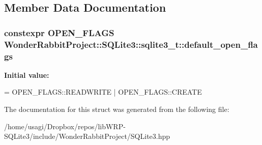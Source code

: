 \subsection{Member Data Documentation}
\hypertarget{structWonderRabbitProject_1_1SQLite3_1_1sqlite3__t_a35b1a27d6aaf21d609df8349bfc9d2ce}{
\subsubsection[{default\-\_\-open\-\_\-flags}]{\setlength{\rightskip}{0pt plus 5cm}constexpr O\-P\-E\-N\-\_\-\-F\-L\-A\-G\-S Wonder\-Rabbit\-Project\-::\-S\-Q\-Lite3\-::sqlite3\-\_\-t\-::default\-\_\-open\-\_\-flags\hspace{0.3cm}{\ttfamily [static]}}}\label{structWonderRabbitProject_1_1SQLite3_1_1sqlite3__t_a35b1a27d6aaf21d609df8349bfc9d2ce}
{\bfseries Initial value\-:}
\begin{DoxyCode}
= OPEN\_FLAGS::READWRITE
        | OPEN\_FLAGS::CREATE
\end{DoxyCode}


The documentation for this struct was generated from the following file\-:\begin{DoxyCompactItemize}
\item 
/home/usagi/\-Dropbox/repos/lib\-W\-R\-P-\/\-S\-Q\-Lite3/include/\-Wonder\-Rabbit\-Project/S\-Q\-Lite3.\-hpp\end{DoxyCompactItemize}
